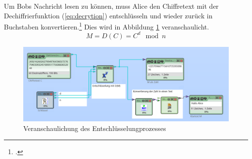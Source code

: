 \documentclass{scrarticle}
\begin{document}
            Um Bobs Nachricht lesen zu können, muss Alice den Chiffretext mit der Dechiffrierfunktion (\ref{eq:decrytion}) entschlüsseln und wieder zurück in Buchstaben konvertieren.\footcite[77]{ertel2003} Dies wird in Abbildung \ref{fig:decrypt} veranschaulicht.
            \begin{equation}
                M = D(C) = C^{d}\mod{n} \label{eq:decrytion}
            \end{equation}
            \begin{figure}[h!]
                \includegraphics[width=\linewidth]{content/cryptool_decrypt_e1.png}
                \caption{Veranschaulichung des Entschlüsselungprozesses\protect\footnotemark}
                \label{fig:decrypt}
            \end{figure}
\end{document}
